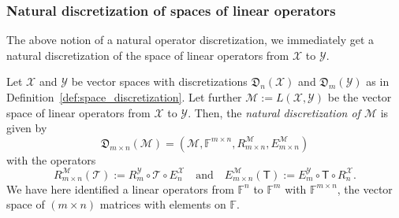 \documentclass[a4paper]{paper}
\newcommand{\Discr}{\mathfrak{D}}
\newcommand{\Spc}[1]{\mathscr{#1}}
\newcommand{\Field}{\mathbb{F}}
\newcommand{\Op}[1]{\mathcal{#1}}
\newcommand{\DiscOp}[1]{\mathsf{#1}}
\newcommand*{\EXT}[2]{\ensuremath{E_{#1}^{#2}}}
\newcommand*{\REST}[2]{\ensuremath{R_{#1}^{#2}}}
\newcommand*{\RnX}{\ensuremath{\REST{n}{\Spc{X}}}}
\newcommand*{\RmY}{\ensuremath{\REST{m}{\Spc{Y}}}}
\newcommand*{\EnX}{\ensuremath{\EXT{n}{\Spc{X}}}}
\newcommand*{\EmY}{\ensuremath{\EXT{m}{\Spc{Y}}}}
\newcommand{\ip}[2]{\left \langle #1,#2 \right\rangle}
\newcommand{\ie}{\textsl{i.e.}\xspace}
\begin{document}
%


\subsubsection{Natural discretization of spaces of linear operators}
The above notion of a natural operator discretization, we immediately get a natural discretization of the space of 
linear operators from $\Spc{X}$ to $\Spc{Y}$.

\begin{definition}
 \label{def:operator_space_discretization}
 Let $\Spc{X}$ and $\Spc{Y}$ be vector spaces with discretizations $\Discr_n(\Spc{X})$ and $\Discr_m(\Spc{Y})$ 
 as in Definition~\ref{def:space_discretization}. Let further $\Spc{M} := L(\Spc{X}, \Spc{Y})$ be the vector 
 space of linear operators from $\Spc{X}$ to $\Spc{Y}$. Then, the \emph{natural discretization of $\Spc{M}$} is given by
 \begin{equation*}
  \Discr_{m\times n}(\Spc{M}) = \left( \Spc{M}, \Field^{m\times n}, \REST{m\times n}{\Spc{M}}, \EXT{m\times n}{\Spc{M}}
  \right)
 \end{equation*}
 with the operators
 \begin{equation*}
  \REST{m\times n}{\Spc{M}}(\Op{T}) := \RmY \circ \Op{T} \circ \EnX
  \quad\text{and}\quad
  \EXT{m\times n}{\Spc{M}}(\DiscOp{T}) := \EmY \circ \DiscOp{T} \circ \RnX.
 \end{equation*}
 We have here identified a linear operators from $\Field^n$ to $\Field^m$ with $\Field^{m\times n}$, the vector space 
 of $(m \times n)$ matrices with elements on $\Field$.
\end{definition}
\end{document}
